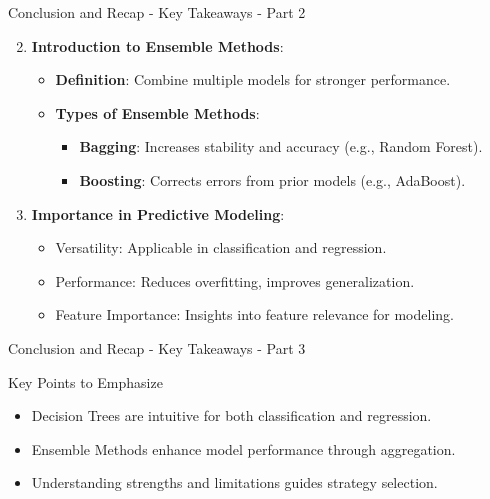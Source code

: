 \documentclass[aspectratio=169]{beamer}
\begin{document}
\begin{frame}[fragile]{Conclusion and Recap - Key Takeaways - Part 2}
    \begin{enumerate}
        \setcounter{enumi}{1} %
        \item \textbf{Introduction to Ensemble Methods}:
        \begin{itemize}
            \item \textbf{Definition}: Combine multiple models for stronger performance.
            \item \textbf{Types of Ensemble Methods}:
            \begin{itemize}
                \item \textbf{Bagging}: Increases stability and accuracy (e.g., Random Forest).
                \item \textbf{Boosting}: Corrects errors from prior models (e.g., AdaBoost).
            \end{itemize}
        \end{itemize}

        \item \textbf{Importance in Predictive Modeling}:
        \begin{itemize}
            \item Versatility: Applicable in classification and regression.
            \item Performance: Reduces overfitting, improves generalization.
            \item Feature Importance: Insights into feature relevance for modeling.
        \end{itemize}
    \end{enumerate}
\end{frame}

\begin{frame}[fragile]{Conclusion and Recap - Key Takeaways - Part 3}
    \begin{block}{Key Points to Emphasize}
        \begin{itemize}
            \item Decision Trees are intuitive for both classification and regression.
            \item Ensemble Methods enhance model performance through aggregation.
            \item Understanding strengths and limitations guides strategy selection.
        \end{itemize}
    \end{block}
\end{frame}
\end{document}
